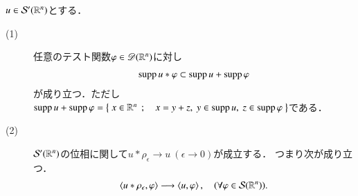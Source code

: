 	\begin{screen}
		\begin{thm}\label{thm:supp_of_tempered_distributions_1}
			$u \in \mathcal{S}'(\mathbb{R}^n)$とする．
			\begin{description}
				\item[(1)]	任意のテスト関数$\varphi \in \mathscr{D}(\mathbb{R}^n)$に対し
					\begin{align}
						\operatorname{supp} u \ast \varphi \subset \operatorname{supp} u + \operatorname{supp} \varphi
						\label{eq:thm_supp_of_tempered_distributions_1}
					\end{align}
					が成り立つ．ただし$\operatorname{supp} u + \operatorname{supp} \varphi = \left\{\ x \in \mathbb{R}^n\ \, ; \quad x = y+z,\ y \in \operatorname{supp} u,\ z \in \operatorname{supp} \varphi\ \right\}$である．
					
				\item[(2)] 
					$\mathcal{S}'(\mathbb{R}^n)$の位相に関して$u \ast \rho_\epsilon \longrightarrow u\ (\epsilon \longrightarrow 0)$が成立する．
					つまり次が成り立つ．
					\begin{align}
						\inprod<u \ast \rho_\epsilon,\varphi> \longrightarrow \inprod<u,\varphi>,
						\quad (\forall \varphi \in \rapid{\R^n}).
					\end{align}
			\end{description}
		\end{thm}
	\end{screen}
	
